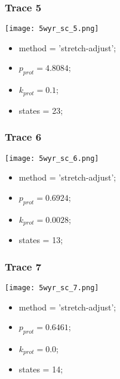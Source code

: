 \subsubsection{Trace 5}
\begin{minipage}[c]{0.7\textwidth}
    \texttt{[image: 5wyr\_sc\_5.png]}
\end{minipage}
\hfill
\begin{minipage}[c]{0.45\textwidth}
    \begin{itemize}
        \item method = 'stretch-adjust';
        \item $p_{prot}=4.8084$;
        \item $k_{prot}=0.1$;
        \item states = 23;
    \end{itemize}
\end{minipage}

\subsubsection{Trace 6}
\begin{minipage}[c]{0.7\textwidth}
    \texttt{[image: 5wyr\_sc\_6.png]}
\end{minipage}
\hfill
\begin{minipage}[c]{0.45\textwidth}
    \begin{itemize}
        \item method = 'stretch-adjust';
        \item $p_{prot}=0.6924$;
        \item $k_{prot}=0.0028$;
        \item states = 13;
    \end{itemize}
\end{minipage}

\subsubsection{Trace 7}
\begin{minipage}[c]{0.7\textwidth}
    \texttt{[image: 5wyr\_sc\_7.png]}
\end{minipage}
\hfill
\begin{minipage}[c]{0.45\textwidth}
    \begin{itemize}
        \item method = 'stretch-adjust';
        \item $p_{prot}=0.6461$;
        \item $k_{prot}=0.0$;
        \item states = 14;
    \end{itemize}
\end{minipage}

